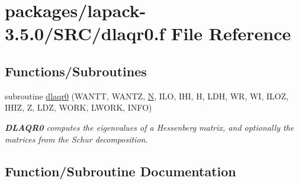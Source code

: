 \hypertarget{dlaqr0_8f}{}\section{packages/lapack-\/3.5.0/\+S\+R\+C/dlaqr0.f File Reference}
\label{dlaqr0_8f}
\subsection*{Functions/\+Subroutines}
\begin{DoxyCompactItemize}
\item 
subroutine \hyperlink{dlaqr0_8f_aa0f06b236f313b54f85fed1b62c152dc}{dlaqr0} (W\+A\+N\+T\+T, W\+A\+N\+T\+Z, \hyperlink{polmisc_8c_a0240ac851181b84ac374872dc5434ee4}{N}, I\+L\+O, I\+H\+I, H, L\+D\+H, W\+R, W\+I, I\+L\+O\+Z, I\+H\+I\+Z, Z, L\+D\+Z, W\+O\+R\+K, L\+W\+O\+R\+K, I\+N\+F\+O)
\begin{DoxyCompactList}\small\item\em {\bfseries D\+L\+A\+Q\+R0} computes the eigenvalues of a Hessenberg matrix, and optionally the matrices from the Schur decomposition. \end{DoxyCompactList}\end{DoxyCompactItemize}


\subsection{Function/\+Subroutine Documentation}
\hypertarget{dlaqr0_8f_aa0f06b236f313b54f85fed1b62c152dc}{}
